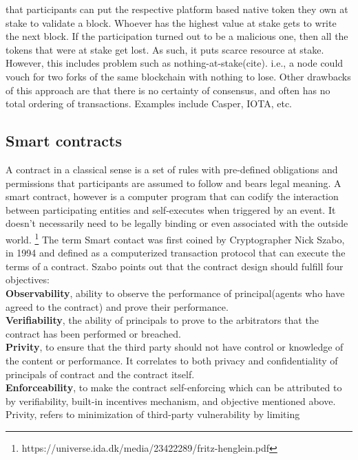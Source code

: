 \begin{itemize}
		that participants can put the respective platform based native token
		they own at stake to validate a block. Whoever has the highest value at
		stake gets to write the next block. If the participation turned out to
		be a malicious one, then all the tokens that were at stake get lost. As
		such, it puts scarce resource at stake. However, this includes problem
		such as nothing-at-stake(cite). i.e., a node could vouch for two forks
		of the same blockchain with nothing to lose. Other drawbacks of this
		approach are that there is no certainty of consensus, and often has no
		total ordering of transactions. Examples include Casper, IOTA, etc. 
\end{itemize}

\subsection{Smart contracts}
A contract in a classical sense is a set of rules with pre-defined obligations
and permissions that participants are assumed to follow and bears legal
meaning. A smart contract, however is a computer program that can codify the
interaction between participating entities and self-executes when triggered by
an event. It doesn't necessarily need to be legally binding or even associated
with the outside world. 
\footnote{https://universe.ida.dk/media/23422289/fritz-henglein.pdf}
The term Smart contact was first coined by Cryptographer Nick Szabo, in 1994
\cite{SzaboSmart1994} and defined as a computerized transaction protocol that
can execute the terms of a contract. Szabo points out that the contract
design should fulfill four objectives\cite{szabo1996smart}: \\
\textbf{Observability}, ability to observe the performance of principal(agents
who have agreed to the contract) and prove their performance.\\
\textbf{Verifiability}, the ability of principals to prove to the arbitrators
that the contract has been performed or breached. \\ 
\textbf{Privity}, to ensure that the third party should not have control or
knowledge of the content or performance. It correlates to both privacy and
confidentiality of principals of contract and the contract itself. \\
\textbf{Enforceability}, to make the contract self-enforcing which can be
attributed to by verifiability, built-in incentives mechanism, and objective
mentioned above. \\
Privity, refers to minimization of third-party vulnerability by limiting
